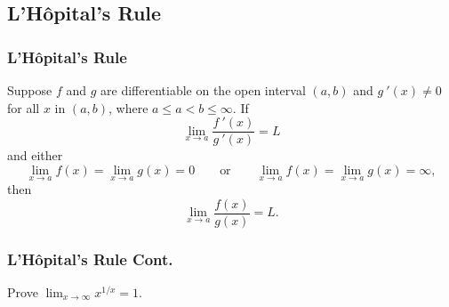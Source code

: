 \documentclass{beamer}
\begin{document}

\subsection{L'H\^{o}pital's Rule}

\begin{frame}
\frametitle{L'H\^{o}pital's Rule}

\begin{Theorem}
Suppose $f$ and $g$ are differentiable on the open interval $(a, b)$ and $g\ ' (x) \neq 0$ for all $x$ in $(a, b)$, where $a\leq a < b \leq \infty$. If
$$
\lim_{x\to a} \frac{f\ '(x)}{g\ '(x)} = L
$$
and either
$$
\lim_{x\to a} f(x) = \lim_{x\to a} g(x) = 0\qquad\text{or}\qquad \lim_{x\to a} f(x) = \lim_{x\to a} g(x) = \infty,
$$
then
$$
\lim_{x\to a} \frac{f(x)}{g(x)} = L.
$$
\end{Theorem}
\end{frame}

\begin{frame}[t]
\frametitle{L'H\^{o}pital's Rule Cont.}
\begin{Example}
Prove $\displaystyle\lim_{x\to\infty} x^{1/x} = 1$.
\end{Example}
\end{frame}
\end{document}

